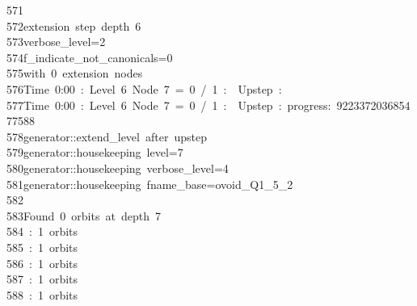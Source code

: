 \begin{tabbing}
571\>\\[0pt]
572\>extension\ step\ depth\ 6\\[0pt]
573\>verbose\_level=2\\[0pt]
574\>f\_indicate\_not\_canonicals=0\\[0pt]
575\>with\ 0\ extension\ nodes\\[0pt]
576\>Time\ 0:00\ :\ Level\ 6\ Node\ 7\ =\ 0\ /\ 1\ :\ \ Upstep\ :\ \\[0pt]
577\>Time\ 0:00\ :\ Level\ 6\ Node\ 7\ =\ 0\ /\ 1\ :\ \ Upstep\ :\ progress:\ 922337203685477588\ \ \\[0pt]
578\>generator::extend\_level\ after\ upstep\\[0pt]
579\>generator::housekeeping\ level=7\\[0pt]
580\>generator::housekeeping\ verbose\_level=4\\[0pt]
581\>generator::housekeeping\ fname\_base=ovoid\_Q1\_5\_2\\[0pt]
582\>\\[0pt]
583\>Found\ 0\ orbits\ at\ depth\ 7\\[0pt]
584\ :\ 1\ orbits\\[0pt]
585\ :\ 1\ orbits\\[0pt]
586\ :\ 1\ orbits\\[0pt]
587\ :\ 1\ orbits\\[0pt]
588\ :\ 1\ orbits\\[0pt]

\end{tabbing}
